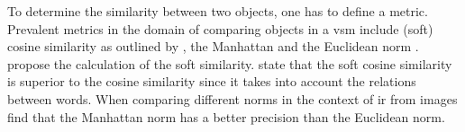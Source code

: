 To determine the similarity between two objects, one has to define a metric.
Prevalent metrics in the domain of comparing objects in a \ac{vsm} include (soft) cosine similarity 
as outlined by \citeauthor{soft_cosine2014}, \citeauthor{soft_cosine2017} \cite{soft_cosine2014, soft_cosine2017}
the Manhattan and the Euclidean norm \cite{euclidean_l2_norm2015}.
\citeauthor{soft_cosine2014} propose the calculation of the soft similarity.
\citeauthor{soft_cosine2017} state that the soft cosine similarity is superior to the cosine similarity since it takes into account the relations between words.
When comparing different norms in the context of \ac{ir} from images \citeauthor{euclidean_l2_norm2015} find that the Manhattan norm has a better 
precision than the Euclidean norm.